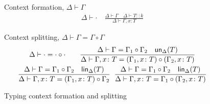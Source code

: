 \begin{figure}[t]
  Context formation, $\Delta \vdash \Gamma$
  \begin{gather*}
    \Delta \vdash \cdot
    \quad
    \frac{
      \Delta \vdash \Gamma
      \quad
      \Delta \vdash T :: k
    }{
      \Delta \vdash \Gamma, x\colon T
    }
  \end{gather*}

  Context splitting, $\Delta \vdash \Gamma = \Gamma \circ \Gamma$
  \begin{gather*}
    \Delta \vdash \cdot = \cdot \circ \cdot
    \qquad
    \frac{
      \Delta \vdash \Gamma = \Gamma_1 \circ \Gamma_2
      \quad
      \un_\Delta(T)
    }{
      \Delta \vdash \Gamma, x\colon T = (\Gamma_1,x\colon T) \circ (\Gamma_2,x\colon T)
    }
    \\
    \frac{
      \Delta \vdash \Gamma = \Gamma_1 \circ \Gamma_2
      \quad
      \lin_\Delta(T)
    }{
      \Delta \vdash \Gamma, x\colon T = (\Gamma_1,x\colon T) \circ \Gamma_2
    }
    \;\;%
    \frac{
      \Delta \vdash \Gamma = \Gamma_1 \circ \Gamma_2
    \quad
      \lin_\Delta(T)
    }{
      \Delta \vdash \Gamma, x\colon T = \Gamma_1 \circ (\Gamma_2,x\colon T)
    }
  \end{gather*}
  
  \caption{Typing context formation and splitting}
  \label{fig:contexts}
\end{figure}

